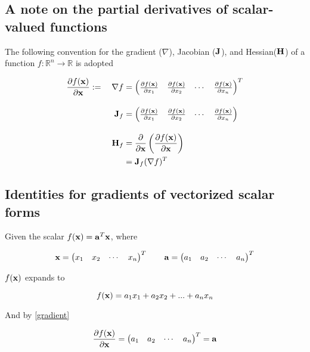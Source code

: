 \documentclass{article}
\newcommand{\R}{\mathbb{R}}
\newcommand{\vect}[1]{\textbf{\textrm{#1}}}
\newcommand{\pd}[2]{\frac{\partial {#1}}{\partial {#2}}}
\begin{document}
\subsection{A note on the partial derivatives of scalar-valued functions}
The following convention for the gradient ($\nabla$), Jacobian ($\vect{J}$), and Hessian($\vect{H}$) of a function $f: \R^n \rightarrow \R$ is adopted

\begin{align}
	\pd{f(\vect{x})}{\vect{x}} := \quad \nabla f & = 
	\begin{pmatrix}
		\pd{f(\vect{x})}{x_1} & \pd{f(\vect{x})}{x_2} & \cdots & \pd{f(\vect{x})}{x_n}
	\end{pmatrix}^{T} \label{gradient} \\[1em]
	\vect{J}_f & = 
	\begin{pmatrix}
		\pd{f(\vect{x})}{x_1} & \pd{f(\vect{x})}{x_2} & \cdots & \pd{f(\vect{x})}{x_n}
	\end{pmatrix} \label{jacobian} \\[1em]
	\vect{H}_f & = \pd{}{\vect{x}} \left( \pd{f(\vect{x})}{\vect{x}} \right) \nonumber \\
	& = \vect{J}_f(\nabla f)^{T} \label{hessian}
\end{align}	

\subsection{Identities for gradients of vectorized scalar forms}
Given the scalar $f(\vect{x}) = \vect{a}^{T}\vect{x}$, where

\begin{equation*}
	\vect{x}= 
	\begin{pmatrix}
		x_1 & x_2 & \cdots & x_n
	\end{pmatrix}^{T}
	\qquad \vect{a} = 
	\begin{pmatrix}
		a_1 & a_2 & \cdots & a_n
	\end{pmatrix}^{T}
\end{equation*}

$f(\vect{x})$ expands to

\begin{equation*}
	f(\vect{x}) = a_1x_1 + a_2x_2 + ... + a_nx_n
\end{equation*}

And by \eqref{gradient}

\begin{equation*}
	\pd{f(\vect{x})}{\vect{x}} = 
	\begin{pmatrix}
		a_1 & a_2 & \cdots & a_n
	\end{pmatrix}^{T} 
	= \vect{a}
\end{equation*}
\end{document}
